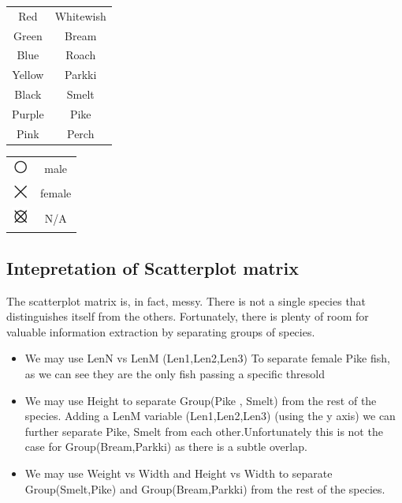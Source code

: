 \documentclass[openany]{article}
\begin{document}
		\begin{center}
			
			\begin{tabular}{ c c }
				Red & Whitewish  \\ 
				Green & Bream \\ 
				Blue & Roach \\ 
				Yellow & Parkki\\ 
				Black & Smelt\\ 
				Purple & Pike\\ 
				Pink & Perch\\ 
			\end{tabular}
			\begin{tabular}{ c c }
				\includegraphics[scale=0.4]{res/1} & male  \\ 
				\includegraphics[scale=0.4]{res/4} & female  \\ 
				\includegraphics[scale=0.4]{res/13} & N/A  \\ 
			\end{tabular}
		\end{center}
		\subsection{Intepretation of Scatterplot matrix}
			The scatterplot matrix is, in fact, messy. There is not a single species that distinguishes itself from the others. Fortunately, there is plenty 
			of room for valuable information extraction by separating groups of species.
			\begin{itemize}
				\item We may use LenN vs LenM (Len1,Len2,Len3) To separate female Pike fish, as we can see they are the only fish passing a specific thresold
				\item We may use Height to separate Group(Pike , Smelt) from the rest of the species. Adding a LenM variable (Len1,Len2,Len3) (using the y axis) we can further separate Pike, Smelt from each other.Unfortunately this is not the case for Group(Bream,Parkki) as there is a subtle overlap.
				\item We may use Weight vs Width and Height vs Width to separate Group(Smelt,Pike) and Group(Bream,Parkki) from the rest of the species.
			\end{itemize} 
\end{document}
